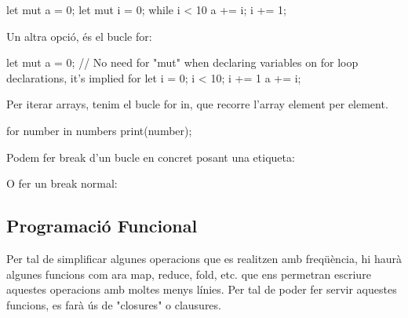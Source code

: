 ﻿\documentclass{article}
\begin{document}
\begin{code}
let mut a = 0;
let mut i = 0;
while i < 10 {
    a += i;
    i += 1;
}
\end{code}

Un altra opció, és el bucle for:

\begin{code}
let mut a = 0;
// No need for "mut" when declaring variables on for loop declarations, it's implied
for let i = 0; i < 10; i += 1 {
    a += i;
}
\end{code}

Per iterar arrays, tenim el bucle for in, que recorre l'array element per element.

\begin{code}
for number in numbers {
    print(number);
}
\end{code}


Podem fer break d'un bucle en concret posant una etiqueta:


O fer un break normal:


\subsection{Programació Funcional}

Per tal de simplificar algunes operacions que es realitzen amb freqüència, hi
haurà algunes funcions com ara map, reduce, fold, etc. que ens permetran
escriure aquestes operacions amb moltes menys línies. Per tal de poder fer servir
aquestes funcions, es farà ús de "closures" o clausures.

\end{document}
